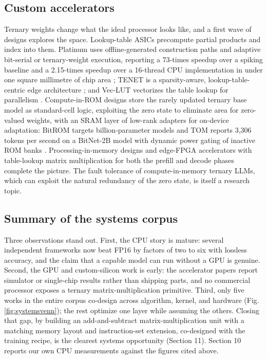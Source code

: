 \documentclass[11pt]{article}
\begin{document}
\subsection{Custom accelerators}

Ternary weights change what the ideal processor looks like, and a first wave of designs
explores the space. Lookup-table ASICs precompute partial products and index into them.
Platinum uses offline-generated construction paths and adaptive bit-serial or
ternary-weight execution, reporting a 73-times speedup over a spiking baseline and a
2.15-times speedup over a 16-thread CPU implementation in under one square millimetre of
chip area \cite{Shan2025-Platinum}; TENET is a sparsity-aware, lookup-table-centric edge
architecture \cite{Anon2025-TENET}; and Vec-LUT vectorizes the table lookup for parallelism
\cite{Li2025-VecLUT}. Compute-in-ROM designs store the rarely updated ternary base model as
standard-cell logic, exploiting the zero state to eliminate area for zero-valued
weights, with an SRAM layer of low-rank adapters for on-device adaptation: BitROM
targets billion-parameter models \cite{Zhang2025-BitROM} and TOM reports 3,306 tokens per
second on a BitNet-2B model with dynamic power gating of inactive ROM banks
\cite{Guan2026-TOM}. Processing-in-memory designs \cite{Malekar2025-PIMLLM,Ortega2024-PIMAI}
and edge-FPGA accelerators with table-lookup matrix multiplication for both the prefill
and decode phases \cite{Xu2025-TeLLMe,Qiao2025-TeLLMev2,Chen2025-TerEffic} complete the
picture. The fault tolerance of compute-in-memory ternary LLMs, which can exploit the
natural redundancy of the zero state, is itself a research topic.

\subsection{Summary of the systems corpus}

Three observations stand out. First, the CPU story is mature: several independent
frameworks now beat FP16 by factors of two to six with lossless accuracy, and the claim
that a capable model can run without a GPU is genuine. Second, the GPU and custom-silicon
work is early: the accelerator papers report simulator or single-chip results rather
than shipping parts, and no commercial processor exposes a ternary
matrix-multiplication primitive. Third, only five works in the entire corpus co-design
across algorithm, kernel, and hardware (Fig. \ref{fig:systemsvenn}); the rest optimize one layer while assuming the
others. Closing that gap, by building an add-and-subtract matrix-multiplication unit
with a matching memory layout and instruction-set extension, co-designed with the
training recipe, is the clearest systems opportunity (Section 11). Section 10 reports
our own CPU measurements against the figures cited above.
\end{document}
